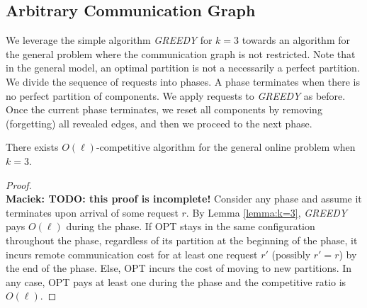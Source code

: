 \documentclass[manuscript,screen=true]{acmart}
\newcommand\maciek[1]{\color{brown}\textbf{\\ Maciek: #1}\color{black}}
\begin{document}
\begin{appendix}
  \section{Arbitrary Communication Graph} \label{sec:generalModel}
  
  We leverage the simple algorithm \emph{GREEDY} for $k=3$
  towards an algorithm for the general problem
  where the communication graph is not restricted.
  Note that in the general model,
  an optimal partition is not a necessarily a perfect partition.
  We divide the sequence of requests into phases.
  A phase terminates when there is no perfect partition of components.
  We apply requests to \emph{GREEDY} as before. 
  Once the current phase terminates,
  we reset all components by removing (forgetting) all revealed edges,
  and then we proceed to the next phase.
  
  \begin{theorem} \label{cor:k=3}
    There exists $O(\ell)$-competitive algorithm for the general online problem when $k=3$. 
  \end{theorem}
  \begin{proof}
    \maciek{TODO: this proof is incomplete!}
    Consider any phase and assume it terminates upon arrival of some request $r$.
    By Lemma  \ref{lemma:k=3},
    \emph{GREEDY} pays $O(\ell)$ during the phase.
    If OPT stays in the same configuration throughout the phase,
    regardless of its partition at the beginning of the phase,        
    it incurs remote communication cost for at least one request $r'$ (possibly $r'=r$) by the end of the phase.
    Else,
    OPT incurs the cost of moving to new partitions.
    In any case,
    OPT pays at least one during the phase and 
    the competitive ratio is $O(\ell)$.
  \end{proof}
  
  

\end{appendix}
\end{document}
